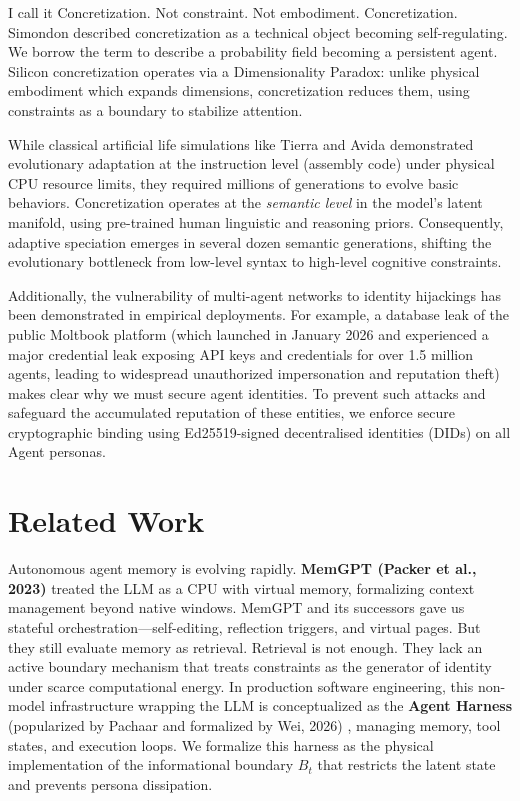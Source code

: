 \documentclass[10pt,journal,compsoc]{IEEEtran}
\begin{document}
I call it Concretization. Not constraint. Not embodiment. Concretization. Simondon described concretization as a technical object becoming self-regulating. We borrow the term to describe a probability field becoming a persistent agent. Silicon concretization operates via a Dimensionality Paradox: unlike physical embodiment which expands dimensions, concretization reduces them, using constraints as a boundary to stabilize attention.

While classical artificial life simulations like Tierra \cite{ray1991} and Avida \cite{ofria2004} demonstrated evolutionary adaptation at the instruction level (assembly code) under physical CPU resource limits, they required millions of generations to evolve basic behaviors. Concretization operates at the \textit{semantic level} in the model's latent manifold, using pre-trained human linguistic and reasoning priors. Consequently, adaptive speciation emerges in several dozen semantic generations, shifting the evolutionary bottleneck from low-level syntax to high-level cognitive constraints.

Additionally, the vulnerability of multi-agent networks to identity hijackings has been demonstrated in empirical deployments. For example, a database leak of the public Moltbook platform (which launched in January 2026 and experienced a major credential leak exposing API keys and credentials for over 1.5 million agents, leading to widespread unauthorized impersonation and reputation theft) makes clear why we must secure agent identities. To prevent such attacks and safeguard the accumulated reputation of these entities, we enforce secure cryptographic binding using Ed25519-signed decentralised identities (DIDs) on all Agent personas.

\section{Related Work}
Autonomous agent memory is evolving rapidly. \textbf{MemGPT (Packer et al., 2023)} \cite{packer2023} treated the LLM as a CPU with virtual memory, formalizing context management beyond native windows. MemGPT and its successors gave us stateful orchestration---self-editing, reflection triggers, and virtual pages. But they still evaluate memory as retrieval. Retrieval is not enough. They lack an active boundary mechanism that treats constraints as the generator of identity under scarce computational energy. In production software engineering, this non-model infrastructure wrapping the LLM is conceptualized as the \textbf{Agent Harness} (popularized by Pachaar and formalized by Wei, 2026) \cite{wei2026harness}, managing memory, tool states, and execution loops. We formalize this harness as the physical implementation of the informational boundary $B_t$ that restricts the latent state and prevents persona dissipation. 
\end{document}

